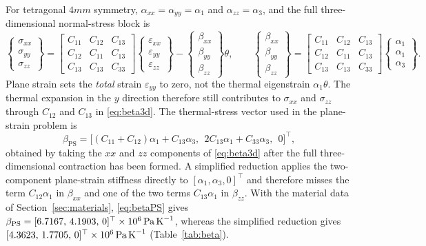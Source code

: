 \documentclass[pdflatex,sn-mathphys-num]{sn-jnl}
\begin{document}
For tetragonal $4mm$ symmetry, $\alpha_{xx}=\alpha_{yy}=\alpha_1$ and
$\alpha_{zz}=\alpha_3$, and the full three-dimensional normal-stress block is
\begin{equation}
\begin{Bmatrix}\sigma_{xx}\\\sigma_{yy}\\\sigma_{zz}\end{Bmatrix}
=
\begin{bmatrix}
C_{11}&C_{12}&C_{13}\\
C_{12}&C_{11}&C_{13}\\
C_{13}&C_{13}&C_{33}
\end{bmatrix}
\begin{Bmatrix}\varepsilon_{xx}\\\varepsilon_{yy}\\\varepsilon_{zz}\end{Bmatrix}
-
\begin{Bmatrix}\beta_{xx}\\\beta_{yy}\\\beta_{zz}\end{Bmatrix}\theta,
\qquad
\begin{Bmatrix}\beta_{xx}\\\beta_{yy}\\\beta_{zz}\end{Bmatrix}
=
\begin{bmatrix}
C_{11}&C_{12}&C_{13}\\
C_{12}&C_{11}&C_{13}\\
C_{13}&C_{13}&C_{33}
\end{bmatrix}
\begin{Bmatrix}\alpha_1\\\alpha_1\\\alpha_3\end{Bmatrix}.
\label{eq:beta3d}
\end{equation}
Plane strain sets the \emph{total} strain $\varepsilon_{yy}$ to zero, not the thermal
eigenstrain $\alpha_1\theta$. The thermal expansion in the $y$ direction therefore
still contributes to $\sigma_{xx}$ and $\sigma_{zz}$ through $C_{12}$ and $C_{13}$ in
\eqref{eq:beta3d}. The thermal-stress vector used in the plane-strain problem is
\begin{equation}
\beta_{\mathrm{PS}}
=
\big[(C_{11}{+}C_{12})\alpha_1+C_{13}\alpha_3,\ \
2C_{13}\alpha_1+C_{33}\alpha_3,\ \
0\big]^{\!\top},
\label{eq:betaPS}
\end{equation}
obtained by taking the $xx$ and $zz$ components of \eqref{eq:beta3d} after the full
three-dimensional contraction has been formed. A simplified reduction applies the
two-component plane-strain stiffness directly to $[\alpha_1,\alpha_3,0]^\top$ and
therefore misses the term $C_{12}\alpha_1$ in $\beta_{xx}$ and one of the two terms
$C_{13}\alpha_1$ in $\beta_{zz}$. With the material data of Section~\ref{sec:materials},
\eqref{eq:betaPS} gives
$\beta_{\mathrm{PS}}=[6.7167,\,4.1903,\,0]^\top\times10^{6}\,\text{Pa\,K}^{-1}$,
whereas the simplified reduction gives
$[4.3623,\,1.7705,\,0]^\top\times10^{6}\,\text{Pa\,K}^{-1}$
(Table~\ref{tab:beta}).
\end{document}
